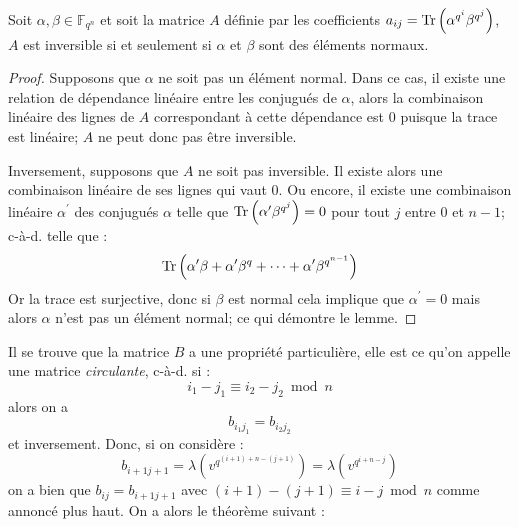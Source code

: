 \documentclass[a4paper]{article} %
\numberwithin{section}{part}
\numberwithin{equation}{section}
\newcommand\GF[1]{\mathbb{F}_{#1}}
\newcommand\Tr[1]{\textup{Tr}\left(#1\right)}
\begin{document}
\begin{lem}
\label{lem:mattrinv}
Soit $\alpha,\beta\in\GF{q^n}$ et soit la matrice $A$ définie par les 
coefficients $a_{ij} = \Tr{\alpha^{q^i}\beta^{q^j}}$, $A$ est inversible si et 
seulement si $\alpha$ et $\beta$ sont des éléments normaux.
\end{lem}
\begin{proof}
Supposons que $\alpha$ ne soit pas un élément normal. Dans ce cas, il existe une
relation de dépendance linéaire entre les conjugués de $\alpha$, alors la 
combinaison linéaire des lignes de $A$ correspondant à cette dépendance est $0$
puisque la trace est linéaire; $A$ ne peut donc pas être inversible.\par
Inversement, supposons que $A$ ne soit pas inversible. Il existe alors une 
combinaison linéaire de ses lignes qui vaut $0$. Ou encore, il existe une 
combinaison linéaire $\alpha^{\prime}$ des conjugués $\alpha$ telle que 
$\Tr{\alpha^{\prime}\beta^{q^j}} = 0$ pour tout $j$ entre $0$ et $n-1$; 
c-à-d. telle que :
\[\Tr{\alpha^{\prime}\beta + \alpha^{\prime}\beta^q + \dots + 
\alpha^{\prime}\beta^{q^{n-1}}}\]
Or la trace est surjective, donc si $\beta$ est normal cela implique que 
$\alpha^{\prime} = 0$ mais alors $\alpha$ n'est pas un élément normal; ce qui 
démontre le lemme.
\end{proof}
Il se trouve que la matrice $B$ a une propriété particulière, 
elle est ce qu'on appelle une matrice \emph{circulante}, c-à-d. si :
\[i_1 - j_1 \equiv i_2 - j_2 \bmod n\]
alors on a 
\[b_{i_1j_1} = b_{i_2j_2}\]
et inversement. Donc, si on considère :
\[b_{i+1j+1} = \lambda\left(v^{q^{(i+1) + n - (j+1)}}\right) = 
\lambda\left(v^{q^{i+n-j}}\right)\]
on a bien que $b_{ij} = b_{i+1j+1}$ avec $(i+1) - (j+1) \equiv i - j \bmod n$ 
comme annoncé plus haut. On a alors le théorème suivant :
\end{document}
